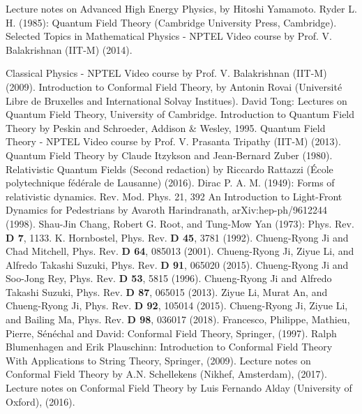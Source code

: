 \documentclass[12pt,a4paper]{report}
\begin{document}
\noindent{\rule{\textwidth}{1.5pt}}

\begin{thebibliography}{00}
  	 Lecture notes on Advanced High Energy Physics, by Hitoshi Yamamoto.
	 Ryder L. H. (1985): Quantum Field Theory (Cambridge University Press, Cambridge).
	 Selected Topics in Mathematical Physics - NPTEL Video course by Prof. V. Balakrishnan (IIT-M) (2014).
	
	 Classical Physics - NPTEL Video course by Prof. V. Balakrishnan (IIT-M) (2009).
     Introduction to Conformal Field Theory, by Antonin Rovai (Université Libre de Bruxelles and International Solvay Institues).
	 David Tong: Lectures on Quantum Field Theory, University of Cambridge.
	 Introduction to Quantum Field Theory by Peskin and Schroeder, Addison & Wesley, 1995.
	 Quantum Field Theory  - NPTEL Video course by Prof. V. Prasanta Tripathy (IIT-M) (2013).
	 Quantum Field Theory by Claude Itzykson and Jean-Bernard Zuber (1980).
	 Relativistic Quantum Fields (Second redaction) by Riccardo Rattazzi (École polytechnique fédérale de Lausanne) (2016).
	 Dirac P. A. M. (1949): Forms of relativistic dynamics. Rev. Mod. Phys. 21, 392
	 An Introduction to Light-Front Dynamics for Pedestrians by Avaroth Harindranath, arXiv:hep-ph/9612244 (1998). 
	 Shau-Jin Chang, Robert G. Root, and Tung-Mow Yan (1973): Phys. Rev. \textbf{D 7}, 1133.
	 K. Hornbostel, Phys. Rev. \textbf{D 45}, 3781 (1992).
	 Chueng-Ryong Ji and Chad Mitchell, Phys. Rev. \textbf{D 64}, 085013 (2001).
	 Chueng-Ryong Ji, Ziyue Li, and Alfredo Takashi Suzuki, Phys. Rev. \textbf{D 91}, 065020 (2015).
	 Chueng-Ryong Ji and Soo-Jong Rey, Phys. Rev. \textbf{D 53}, 5815 (1996).
	 Chueng-Ryong Ji and Alfredo Takashi Suzuki,  Phys. Rev.  \textbf{D 87}, 065015 (2013).
	 Ziyue Li, Murat An, and Chueng-Ryong Ji, Phys. Rev. \textbf{D 92}, 105014 (2015).
	 Chueng-Ryong Ji, Ziyue Li, and Bailing Ma, Phys. Rev. \textbf{D 98}, 036017 (2018).
	 Francesco, Philippe, Mathieu, Pierre, Sénéchal and David: Conformal Field Theory, Springer, (1997).
	 Ralph Blumenhagen and Erik Plauschinn: Introduction to Conformal Field Theory With Applications to String Theory, Springer, (2009).
	 Lecture notes on Conformal Field Theory by A.N. Schellekens (Nikhef, Amsterdam), (2017).
	 Lecture notes on Conformal Field Theory by Luis Fernando Alday (University of Oxford), (2016).
	

	
	
	
\end{thebibliography}
\end{document}
